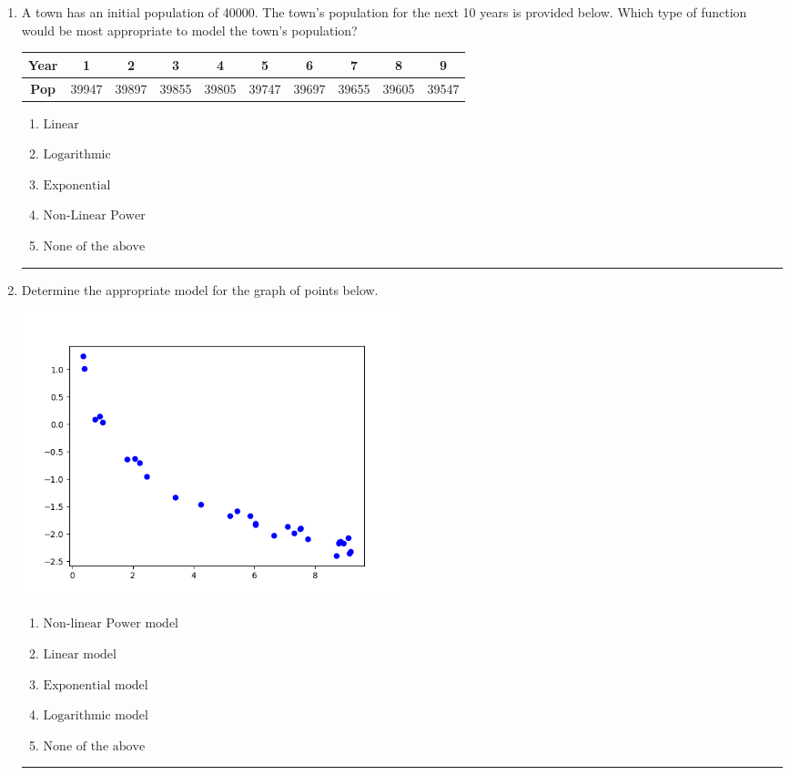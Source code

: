 \documentclass[14pt]{extbook}
\newcommand{\litem}[1]{\item#1\hspace*{-1cm}\rule{\textwidth}{0.4pt}}
\begin{document}
\begin{enumerate}
\litem{
A town has an initial population of 40000. The town's population for the next 10 years is provided below. Which type of function would be most appropriate to model the town's population?

\begin{tabular}{c|c|c|c|c|c|c|c|c|c}
\textbf{Year} &1 &2 &3 &4 &5 &6 &7 &8 &9\tabularnewline \hline
\textbf{Pop} &39947 &39897 &39855 &39805 &39747 &39697 &39655 &39605 &39547\end{tabular}\begin{enumerate}[label=\Alph*.]
\item \( \text{Linear} \)
\item \( \text{Logarithmic} \)
\item \( \text{Exponential} \)
\item \( \text{Non-Linear Power} \)
\item \( \text{None of the above} \)

\end{enumerate} }
\litem{
Determine the appropriate model for the graph of points below.
\begin{center}
    \includegraphics[width=0.5\textwidth]{../Figures/identifyModelGraph11CopyB.png}
\end{center}
\begin{enumerate}[label=\Alph*.]
\item \( \text{Non-linear Power model} \)
\item \( \text{Linear model} \)
\item \( \text{Exponential model} \)
\item \( \text{Logarithmic model} \)
\item \( \text{None of the above} \)


\end{enumerate}}
\end{enumerate}
\end{document}

